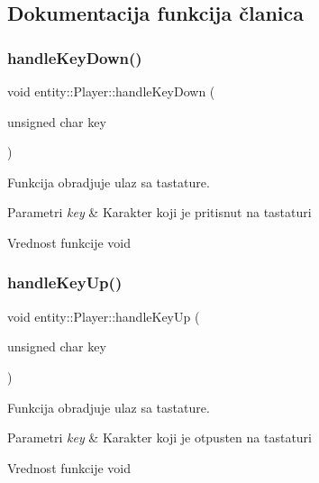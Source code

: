 \subsection{Dokumentacija funkcija članica}
\mbox{\label{classentity_1_1Player_af3d0b548d6daeb37d03f9fa57fb28f8a}} 
\subsubsection{\texorpdfstring{handle\+Key\+Down()}{handleKeyDown()}}
{\footnotesize\ttfamily void entity\+::\+Player\+::handle\+Key\+Down (\begin{DoxyParamCaption}\item[{unsigned char}]{key }\end{DoxyParamCaption})}



Funkcija obradjuje ulaz sa tastature. 


\begin{DoxyParams}{Parametri}
{\em key} & Karakter koji je pritisnut na tastaturi \\
\hline
\end{DoxyParams}
\begin{DoxyReturn}{Vrednost funkcije}
void 
\end{DoxyReturn}
\mbox{\label{classentity_1_1Player_a27a2007873610439598c0ac07a91f3ac}} 
\subsubsection{\texorpdfstring{handle\+Key\+Up()}{handleKeyUp()}}
{\footnotesize\ttfamily void entity\+::\+Player\+::handle\+Key\+Up (\begin{DoxyParamCaption}\item[{unsigned char}]{key }\end{DoxyParamCaption})}



Funkcija obradjuje ulaz sa tastature. 


\begin{DoxyParams}{Parametri}
{\em key} & Karakter koji je otpusten na tastaturi \\
\hline
\end{DoxyParams}
\begin{DoxyReturn}{Vrednost funkcije}
void 
\end{DoxyReturn}
\mbox{\label{classentity_1_1Player_a9b0a7ab96a4ba7c24c7ddac8f07c4d5e}} 

